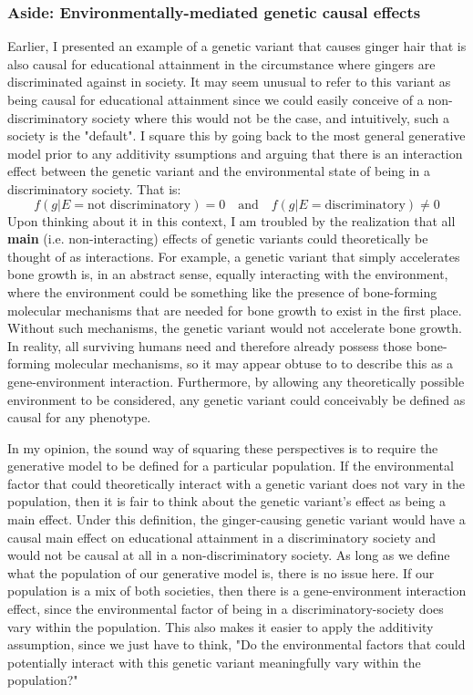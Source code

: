 \documentclass[12pt]{article}
\begin{document}
\subsubsection{Aside: Environmentally-mediated genetic causal effects}
Earlier, I presented an example of a genetic variant that causes ginger hair that is also causal for educational attainment in the circumstance where gingers are discriminated against in society.
It may seem unusual to refer to this variant as being causal for educational attainment since we could easily conceive of a non-discriminatory society where this would not be the case, and intuitively, such a society is the "default".
I square this by going back to the most general generative model prior to any additivity ssumptions and arguing that there is an interaction effect between the genetic variant and the environmental state of being in a discriminatory society. That is:
$$ f(g|E = \text{not discriminatory}) = 0
\quad \text{and} \quad f(g|E = \text{discriminatory}) \neq 0$$
Upon thinking about it in this context, I am troubled by the realization that all \textbf{main} (i.e. non-interacting) effects of genetic variants could theoretically be thought of as interactions.
For example, a genetic variant that simply accelerates bone growth is, in an abstract sense, equally interacting with the environment, where the environment could be something like the presence of bone-forming molecular mechanisms that are needed for bone growth to exist in the first place.
Without such mechanisms, the genetic variant would not accelerate bone growth.
In reality, all surviving humans need and therefore already possess those bone-forming molecular mechanisms, so it may appear obtuse to to describe this as a gene-environment interaction.
Furthermore, by allowing any theoretically possible environment to be considered, any genetic variant could conceivably be defined as causal for any phenotype.

In my opinion, the sound way of squaring these perspectives is to require the generative model to be defined for a particular population.
If the environmental factor that could theoretically interact with a genetic variant does not vary in the population, then it is fair to think about the genetic variant's effect as being a main effect.
Under this definition, the ginger-causing genetic variant would have a causal main effect on educational attainment in a discriminatory society and would not be causal at all in a non-discriminatory society.
As long as we define what the population of our generative model is, there is no issue here.
If our population is a mix of both societies, then there is a gene-environment interaction effect, since the environmental factor of being in a discriminatory-society does vary within the population.
This also makes it easier to apply the additivity assumption, since we just have to think, "Do the environmental factors that could potentially interact with this genetic variant meaningfully vary within the population?" 
\end{document}
